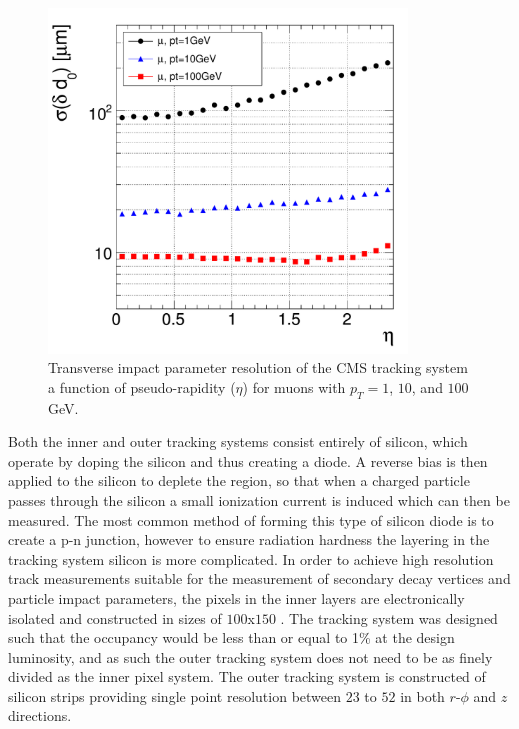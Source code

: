 \begin{figure}[htpb]
\begin{center}
\includegraphics[width=0.85\textwidth]{plots/trackerd0res.pdf}
\caption{Transverse impact parameter resolution of the CMS tracking system a function of pseudo-rapidity ($\eta$) for muons with $p_{T} = 1$, $10$, and $100$ GeV\cite{CMS_DETECTOR}.}
\label{fig:trackerd0res}
\end{center}
\end{figure}

Both the inner and outer tracking systems consist entirely of silicon, which operate by doping the silicon and thus creating a diode. %
A reverse bias is then applied to the silicon to deplete the region, so that when a charged particle passes through the silicon a small ionization current is induced which can then be measured.
The most common method of forming this type of silicon diode is to create a p-n junction, however to ensure radiation hardness the layering in the tracking system silicon is more complicated\cite{CMS_DETECTOR}. %
In order to achieve high resolution track measurements suitable for the measurement of secondary decay vertices and particle impact parameters, the pixels in the inner layers are electronically isolated and constructed in sizes of $100$x$150$ \micrometer.
The tracking system was designed such that the occupancy would be less than or equal to 1\% at the design luminosity, and as such the outer tracking system does not need to be as finely divided as the inner pixel system.
The outer tracking system is constructed of silicon strips providing single point resolution between $23$ to $52$ \micrometer in both $r$-$\phi$ and $z$ directions.

